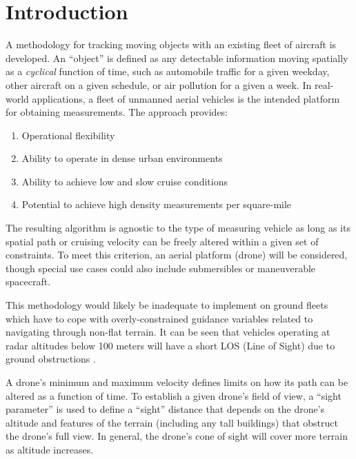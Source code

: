 \documentclass[conf]{new-aiaa}
\begin{document}
\section{Introduction}
A methodology for tracking moving objects with an existing fleet of aircraft is developed. An ``object'' is defined as any detectable information moving spatially as a \emph{cyclical} function of time, such as automobile traffic for a given weekday, other aircraft on a given schedule, or air pollution for a given a week. In real-world applications, a fleet of unmanned aerial vehicles is the intended platform for obtaining measurements. The approach provides:
\begin{enumerate}
\item Operational flexibility
\item Ability to operate in dense urban environments
\item Ability to achieve low and slow cruise conditions
\item Potential to achieve high density measurements per square-mile
\end{enumerate}

The resulting algorithm is agnostic to the type of measuring vehicle as long as its spatial path or cruising velocity can be freely altered within a given set of constraints. To meet this criterion, an aerial platform (drone) will be considered, though special use cases could also include submersibles or maneuverable spacecraft. 

This methodology would likely be inadequate to implement on ground fleets which have to cope with overly-constrained guidance variables related to navigating through non-flat terrain. It can be seen that vehicles operating at radar altitudes below 100 meters will have a short LOS (Line of Sight) due to ground obstructions \cite{amorim2017forConnectedToCellNetworks}.

A drone’s minimum and maximum velocity defines limits on how its path can be altered as a function of time. To establish a given drone’s field of view, a “sight parameter” is used to define a “sight” distance that depends on the drone’s altitude and features of the terrain (including any tall buildings) that obstruct the drone’s full view. In general, the drone’s cone of sight will cover more terrain as altitude increases. \cite{zorbas2013energyefficientmobiletracking}
\end{document}
